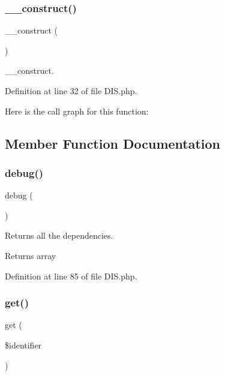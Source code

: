 \subsubsection{\texorpdfstring{\+\_\+\+\_\+construct()}{\_\_construct()}}
{\footnotesize\ttfamily \+\_\+\+\_\+construct (\begin{DoxyParamCaption}{ }\end{DoxyParamCaption})}

\+\_\+\+\_\+construct. 

Definition at line 32 of file D\+I\+S.\+php.

Here is the call graph for this function\+:


\subsection{Member Function Documentation}
\mbox{\label{class_zest_1_1_common_1_1_container_1_1_d_i_s_aaed74f7942d3fc56582e99324500e87b}} 
\subsubsection{\texorpdfstring{debug()}{debug()}}
{\footnotesize\ttfamily debug (\begin{DoxyParamCaption}{ }\end{DoxyParamCaption})}

Returns all the dependencies.

\begin{DoxyReturn}{Returns}
array 
\end{DoxyReturn}


Definition at line 85 of file D\+I\+S.\+php.

\mbox{\label{class_zest_1_1_common_1_1_container_1_1_d_i_s_a711e1d65eb5a7930db612a76ea3bddab}} 
\subsubsection{\texorpdfstring{get()}{get()}}
{\footnotesize\ttfamily get (\begin{DoxyParamCaption}\item[{}]{\$identifier }\end{DoxyParamCaption})}

